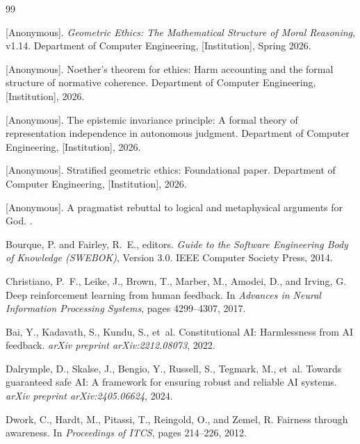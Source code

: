 \documentclass[12pt,letterpaper]{article}
\theoremstyle{definition}
\theoremstyle{plain}
\begin{document}
\begin{thebibliography}{99}

[Anonymous].
\newblock \emph{Geometric Ethics: The Mathematical Structure of Moral Reasoning}, v1.14.
\newblock Department of Computer Engineering, [Institution], Spring 2026.

[Anonymous].
\newblock Noether's theorem for ethics: Harm accounting and the formal structure of normative coherence.
\newblock Department of Computer Engineering, [Institution], 2026.

[Anonymous].
\newblock The epistemic invariance principle: A formal theory of representation independence in autonomous judgment.
\newblock Department of Computer Engineering, [Institution], 2026.

[Anonymous].
\newblock Stratified geometric ethics: Foundational paper.
\newblock Department of Computer Engineering, [Institution], 2026.

[Anonymous].
\newblock A pragmatist rebuttal to logical and metaphysical arguments for God.
.

Bourque, P. and Fairley, R.~E., editors.
\newblock \emph{Guide to the Software Engineering Body of Knowledge (SWEBOK)}, Version 3.0.
\newblock IEEE Computer Society Press, 2014.

Christiano, P.~F., Leike, J., Brown, T., Marber, M., Amodei, D., and Irving, G.
\newblock Deep reinforcement learning from human feedback.
\newblock In \emph{Advances in Neural Information Processing Systems}, pages 4299--4307, 2017.

Bai, Y., Kadavath, S., Kundu, S., et~al.
\newblock Constitutional AI: Harmlessness from AI feedback.
\newblock \emph{arXiv preprint arXiv:2212.08073}, 2022.

Dalrymple, D., Skalse, J., Bengio, Y., Russell, S., Tegmark, M., et~al.
\newblock Towards guaranteed safe AI: A framework for ensuring robust and reliable AI systems.
\newblock \emph{arXiv preprint arXiv:2405.06624}, 2024.

Dwork, C., Hardt, M., Pitassi, T., Reingold, O., and Zemel, R.
\newblock Fairness through awareness.
\newblock In \emph{Proceedings of ITCS}, pages 214--226, 2012.


\end{thebibliography}
\end{document}
